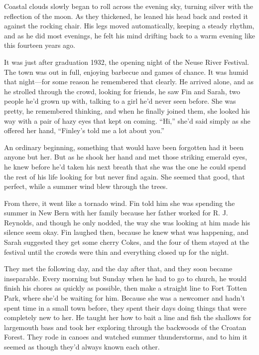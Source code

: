 \documentclass[10pt, twoside, openright]{book}
\begin{document}
Coastal clouds slowly began to roll across the evening sky, turning
silver with the reflection of the moon. As they thickened, he leaned his
head back and rested it against the rocking chair. His legs moved
automatically, keeping a steady rhythm, and as he did most evenings, he
felt his mind drifting back to a warm evening like this fourteen years
ago.

It was just after graduation 1932, the opening night of the Neuse River
Festival. The town was out in full, enjoying barbecue and games of
chance. It was humid that night---for some reason he remembered that
clearly. He arrived alone, and as he strolled through the crowd, looking
for friends, he saw Fin and Sarah, two people he'd grown up with,
talking to a girl he'd never seen before. She was pretty, he remembered
thinking, and when he finally joined them, she looked his way with a
pair of hazy eyes that kept on coming. ``Hi,'' she'd said simply as she
offered her hand, ``Finley's told me a lot about you.''

An ordinary beginning, something that would have been forgotten had it
been anyone but her. But as he shook her hand and met those striking
emerald eyes, he knew before he'd taken his next breath that she was the
one he could spend the rest of his life looking for but never find
again. She seemed that good, that perfect, while a summer wind blew
through the trees.

From there, it went like a tornado wind. Fin told him she was spending
the summer in New Bern with her family because her father worked for R.
J. Reynolds, and though he only nodded, the way she was looking at him
made his silence seem okay. Fin laughed then, because he knew what was
happening, and Sarah suggested they get some cherry Cokes, and the four
of them stayed at the festival until the crowds were thin and everything
closed up for the night.

They met the following day, and the day after that, and they soon became
inseparable. Every morning but Sunday when he had to go to church, he
would finish his chores as quickly as possible, then make a straight
line to Fort Totten Park, where she'd be waiting for him. Because she
was a newcomer and hadn't spent time in a small town before, they spent
their days doing things that were completely new to her. He taught her
how to bait a line and fish the shallows for largemouth bass and took
her exploring through the backwoods of the Croatan Forest. They rode in
canoes and watched summer thunderstorms, and to him it seemed as though
they'd always known each other.
\end{document}
